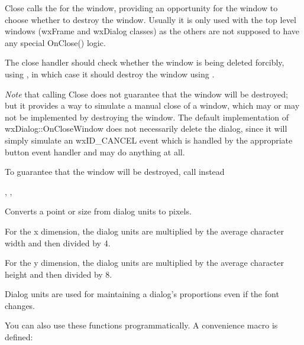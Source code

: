 
Close calls the  for the window, providing
an opportunity for the window to choose whether to destroy the window.
Usually it is only used with the top level windows (wxFrame and wxDialog
classes) as the others are not supposed to have any special OnClose() logic.

The close handler should check whether the window is being deleted forcibly,
using , in which case it
should destroy the window using .

{\it Note} that calling Close does not guarantee that the window will be
destroyed; but it provides a way to simulate a manual close of a window, which
may or may not be implemented by destroying the window. The default
implementation of wxDialog::OnCloseWindow does not necessarily delete the
dialog, since it will simply simulate an wxID\_CANCEL event which is handled by
the appropriate button event handler and may do anything at all.

To guarantee that the window will be destroyed, call
 instead


,\rtfsp
{},\rtfsp
{}


\label{wxwindowconvertdialogtopixels}



Converts a point or size from dialog units to pixels.

For the x dimension, the dialog units are multiplied by the average character width
and then divided by 4.

For the y dimension, the dialog units are multiplied by the average character height
and then divided by 8.


Dialog units are used for maintaining a dialog's proportions even if the font changes.

You can also use these functions programmatically. A convenience macro is defined:


